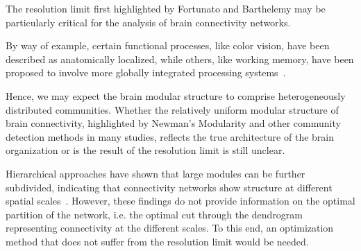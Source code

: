 The resolution limit  first highlighted by Fortunato and Barthelemy may be particularly critical for the analysis of brain connectivity networks.

By way of example, certain functional processes, like color vision, have been described as anatomically localized, while others, like working memory, have been proposed to involve more globally integrated processing systems~.

Hence, we may expect the brain modular structure to comprise heterogeneously distributed communities.
Whether the relatively uniform modular structure of brain connectivity, highlighted by Newman's Modularity and other community detection methods in many studies, reflects the true architecture of the brain organization or is the result of the resolution limit is still unclear.

Hierarchical approaches have shown that large modules can be further subdivided, indicating that connectivity networks show structure at different spatial scales~\cite{meunier2009}.
However, these findings do not provide information on the optimal partition of the network, i.e. the optimal cut through the dendrogram representing connectivity at the different scales.
To this end, an optimization method that does not suffer from the resolution limit would be needed.




